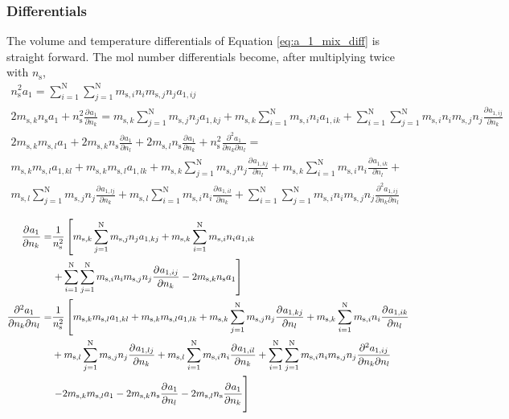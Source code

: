 \documentclass[english]{../thermomemo/thermomemo}
\newcommand*{\pd}[3][]{\frac{\partial^{#1}#2}{\partial{#3}^{#1}}}%
\newcommand*{\pdc}[3]{\frac{\partial^{2}#1}{\partial{#2}\partial{#3}}}%
\newcommand{\seg}{\ensuremath{\text{s}}\xspace}
\newcommand{\nc}{\ensuremath{\text{N}}\xspace}
\begin{document}
\subsubsection{Differentials}
The volume and temperature differentials of Equation
\ref{eq:a_1_mix_diff} is straight forward. The mol number
differentials become, after multiplying twice with $n_\seg$,
\begin{gather}
  \label{eq:a_1_mix_diff}
  n_\seg^2 a_1 =  \sum_{i=1}^\nc\sum_{j=1}^\nc m_{\seg,i} n_i m_{\seg,j} n_j a_{1,ij}\\
  2 m_{\seg,k} n_\seg a_1 + n_\seg^2 \pd{a_1}{n_k} =  m_{\seg,k}\sum_{j=1}^\nc  m_{\seg,j} n_j a_{1,kj} + m_{\seg,k} \sum_{i=1}^\nc m_{\seg,i} n_i a_{1,ik}  + \sum_{i=1}^\nc\sum_{j=1}^\nc m_{\seg,i} n_i m_{\seg,j} n_j \pd{a_{1,ij}}{n_k}\\
    2 m_{\seg,k}m_{\seg,l}  a_1 + 2 m_{\seg,k} n_\seg \pd{a_1}{n_l} + 2 m_{\seg,l} n_\seg \pd{a_1}{n_k} + n_\seg^2 \pdc{a_1}{n_k}{n_l} = \nonumber \\ m_{\seg,k}m_{\seg,l} a_{1,kl} + m_{\seg,k}m_{\seg,l}  a_{1,lk} + m_{\seg,k}\sum_{j=1}^\nc  m_{\seg,j} n_j \pd{a_{1,kj}}{n_l} + m_{\seg,k} \sum_{i=1}^\nc m_{\seg,i} n_i \pd{a_{1,ik}}{n_l}   + \nonumber \\m_{\seg,l}\sum_{j=1}^\nc m_{\seg,j} n_j \pd{a_{1,lj}}{n_k} + m_{\seg,l}\sum_{i=1}^\nc m_{\seg,i} n_i \pd{a_{1,il}}{n_k}  + \sum_{i=1}^\nc\sum_{j=1}^\nc m_{\seg,i} n_i m_{\seg,j} n_j \pdc{a_{1,ij}}{n_k}{n_l}
  \end{gather}

  \begin{align}
  \label{eq:a_1_mix_diff_2}
  \pd{a_1}{n_k} =&  \frac{1}{n_\seg^2} \left[ m_{\seg,k}\sum_{j=1}^\nc  m_{\seg,j} n_j a_{1,kj} + m_{\seg,k} \sum_{i=1}^\nc m_{\seg,i} n_i a_{1,ik}   \right. \nonumber \\ & \left.  + \sum_{i=1}^\nc\sum_{j=1}^\nc m_{\seg,i} n_i m_{\seg,j} n_j \pd{a_{1,ij}}{n_k}- 2 m_{\seg,k} n_\seg a_1 \right]\\
    \pdc{a_1}{n_k}{n_l} =&  \frac{1}{n_\seg^2} \left[  m_{\seg,k}m_{\seg,l} a_{1,kl} + m_{\seg,k}m_{\seg,l}  a_{1,lk} + m_{\seg,k}\sum_{j=1}^\nc  m_{\seg,j} n_j \pd{a_{1,kj}}{n_l} + m_{\seg,k} \sum_{i=1}^\nc m_{\seg,i} n_i \pd{a_{1,ik}}{n_l}  \right. \nonumber \\ &  + m_{\seg,l}\sum_{j=1}^\nc m_{\seg,j} n_j \pd{a_{1,lj}}{n_k} + m_{\seg,l}\sum_{i=1}^\nc m_{\seg,i} n_i \pd{a_{1,il}}{n_k}  + \sum_{i=1}^\nc\sum_{j=1}^\nc m_{\seg,i} n_i m_{\seg,j} n_j \pdc{a_{1,ij}}{n_k}{n_l} \nonumber \\ & \left. -
    2 m_{\seg,k}m_{\seg,l}  a_1 - 2 m_{\seg,k} n_\seg \pd{a_1}{n_l} - 2 m_{\seg,l} n_\seg \pd{a_1}{n_k} \vphantom{\sum_{j=1}^\nc} \right]
\end{align}
\end{document}

